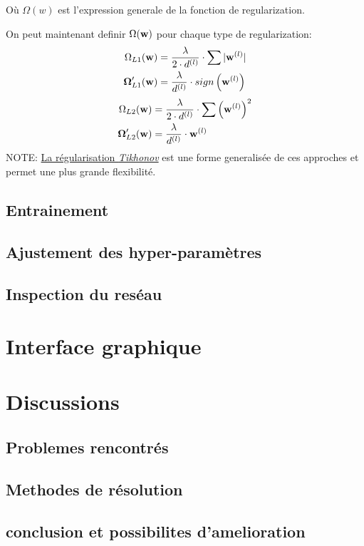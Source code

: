 \documentclass[11pt]{article}
\begin{document}
O\`u $\Omega(w)$ est l'expression generale de la fonction de regularization.

On peut maintenant definir $\Omega({\bf w})$ pour chaque type de regularization:
\begin{equation}
	\begin{aligned}
		\Omega_{L1} ({\bf w}) &= \frac{\lambda}{2\cdot d^{(l)}} \cdot \sum{|{\bf w}^{(l)}|}\\
		\boldsymbol\Omega_{L1}'({\bf w}) &= \frac{\lambda}{d^{(l)}} \cdot sign\left ({\bf w}^{(l)} \right)\\
	\end{aligned}
\end{equation}
\begin{equation}
	\begin{aligned}
		\Omega_{L2} ({\bf w}) &= \frac{\lambda}{2\cdot d^{(l)}} \cdot \sum{\left({\bf w}^{(l)}\right) ^2}\\
		\boldsymbol\Omega_{L2}'({\bf w}) &= \frac{\lambda}{d^{(l)}} \cdot {\bf w}^{(l)}\\
	\end{aligned}
\end{equation}
NOTE: \href{http://work.caltech.edu/slides/slides12.pdf}{La r\'egularisation
\emph{Tikhonov}} est une forme generalis\'ee de ces approches et permet une
plus grande flexibilit\'e.



\subsection{Entrainement}

\subsection{Ajustement des hyper-param\`etres}

\subsection{Inspection du res\'eau}

\section{Interface graphique}



\section{Discussions}
\subsection{Problemes rencontr\'es}
\subsection{Methodes de r\'esolution}
\subsection{conclusion et possibilites d'amelioration}
\end{document}
